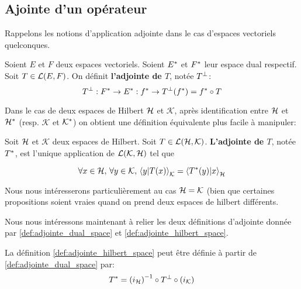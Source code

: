 \subsection{Ajointe d'un opérateur}

Rappelons les notions d'application adjointe dans le cas d'espaces vectoriels
quelconques.

\begin{definition}
	\label{def:adjointe_dual_space}
	Soient $E$ et $F$ deux espaces vectoriels. Soient $E^{*}$ et
	$F^{*}$ leur espace dual respectif.
	Soit $T \in \mathcal{L}(E, F)$. On définit \textbf{l'adjointe de $T$},
	notée $T^{\perp}$:
	\begin{equation}
		T^{\perp} : F^{*} \rightarrow E^{*} : f^{*} \rightarrow
		T^{\perp}(f^{*})
	= f^{*} \circ T
		\label{def:adjointe_operator}
	\end{equation}
\end{definition}

Dans le cas de deux espaces de Hilbert $\mathcal{H}$ et $\mathcal{K}$, après
identification entre $\mathcal{H}$ et $\mathcal{H}^{*}$ (resp. $\mathcal{K}$ et
$\mathcal{K}^{*}$) on obtient une définition équivalente plus facile à
manipuler:

\begin{definition}
	\label{def:adjointe_hilbert_space}
	Soit $\mathcal{H}$ et $\mathcal{K}$ deux espaces de Hilbert.
	Soit $T \in \mathcal{L}(\mathcal{H}, \mathcal{K})$.
	\textbf{L'adjointe de $T$}, notée $T^{*}$, est l'unique application
	de $\mathcal{L}(\mathcal{K}, \mathcal{H})$ tel que

	\begin{equation}
		\forall x \in \mathcal{H}, \, \forall y \in \mathcal{K}, \,
		{\bra{y}\ket{T(x)}}_{\mathcal{K}} = {\bra{T^{*}(y)}\ket{x}}_{\mathcal{H}}
	\end{equation}
\end{definition}

Nous nous intéresserons particulièrement au cas $\mathcal{H} = \mathcal{K}$ (bien
que certaines propositions soient vraies quand on prend deux espaces de hilbert
différents.

Nous nous intéressons maintenant à relier les deux définitions d'adjointe donnée
par \ref{def:adjointe_dual_space} et \ref{def:adjointe_hilbert_space}.

\begin{proposition}
	La définition \ref{def:adjointe_hilbert_space} peut être définie à partir de
	\ref{def:adjointe_dual_space} par:
	\begin{equation}
		T^{*} = {(i_{\mathcal{H}})}^{-1} \circ T^{\perp} \circ
		{(i_{\mathcal{K}})}
	\end{equation}
\end{proposition}

